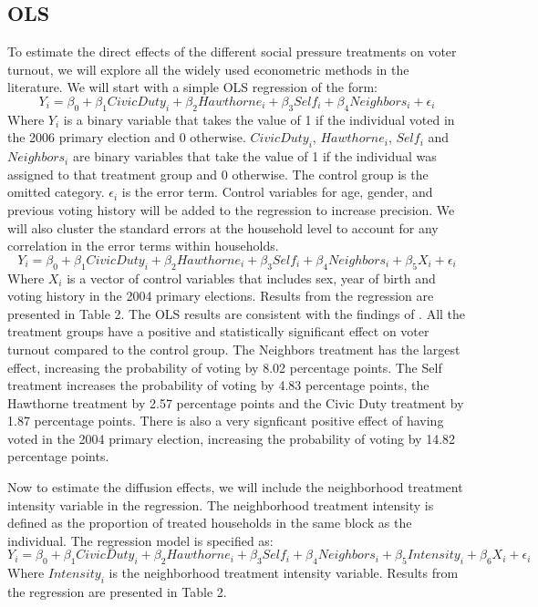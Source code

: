 \documentclass[11pt]{article}
\begin{document}
\subsection{OLS}
To estimate the direct effects of the different social pressure treatments on voter turnout, we will explore all the widely used econometric methods in the literature. We will start with a simple OLS regression of the form:
\begin{equation}
    Y_i = \beta_0 + \beta_1 CivicDuty_i + \beta_2 Hawthorne_i + \beta_3 Self_i + \beta_4 Neighbors_i + \epsilon_i
\end{equation}
Where $Y_i$ is a binary variable that takes the value of 1 if the individual voted in the 2006 primary election and 0 otherwise. $CivicDuty_i$, $Hawthorne_i$, $Self_i$ and $Neighbors_i$ are binary variables that take the value of 1 if the individual was assigned to that treatment group and 0 otherwise. The control group is the omitted category. $\epsilon_i$ is the error term.
Control variables for age, gender, and previous voting history will be added to the regression to increase precision. We will also cluster the standard errors at the household level to account for any correlation in the error terms within households.
\begin{equation}
    Y_i = \beta_0 + \beta_1 CivicDuty_i + \beta_2 Hawthorne_i + \beta_3 Self_i + \beta_4 Neighbors_i + \beta_5 X_i + \epsilon_i
\end{equation}
Where $X_i$ is a vector of control variables that includes sex, year of birth and voting history in the 2004 primary elections. Results from the regression are presented in Table 2. 
The OLS results are consistent with the findings of \cite{gerber_social_2008}. All the treatment groups have a positive and statistically significant effect on voter turnout compared to the control group. The Neighbors treatment has the largest effect, increasing the probability of voting by 8.02 percentage points. The Self treatment increases the probability of voting by 4.83 percentage points, the Hawthorne treatment by 2.57 percentage points and the Civic Duty treatment by 1.87 percentage points. There is also a very signficant positive effect of having voted in the 2004 primary election, increasing the probability of voting by 14.82 percentage points.

Now to estimate the diffusion effects, we will include the neighborhood treatment intensity variable in the regression. The neighborhood treatment intensity is defined as the proportion of treated households in the same block as the individual. The regression model is specified as:
\begin{equation}
    Y_i = \beta_0 + \beta_1 CivicDuty_i + \beta_2 Hawthorne_i + \beta_3 Self_i + \beta_4 Neighbors_i + \beta_5 Intensity_i + \beta_6 X_i + \epsilon_i
\end{equation}
Where $Intensity_i$ is the neighborhood treatment intensity variable. Results from the regression are presented in Table 2.
\end{document}
